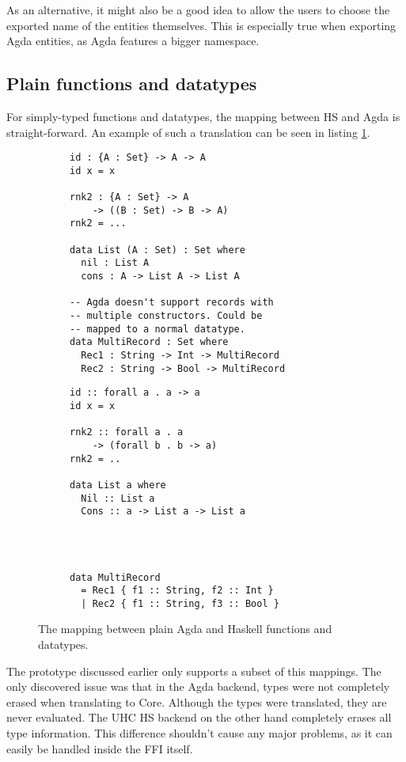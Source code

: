 \documentclass[12pt, a4paper, twoside]{report}
\begin{document}
As an alternative, it might also be a good idea to allow the users to choose the exported name of the entities themselves.
This is especially true when exporting Agda entities, as Agda features a bigger namespace.

\subsection{Plain functions and datatypes}
For simply-typed functions and datatypes, the mapping between HS and Agda is straight-forward. An example of such
a translation can be seen in listing \ref{lst:plain-agda-hs}.
\begin{figure}
\begin{subfigure}[b]{0.5\textwidth}
\begin{lstlisting}
id : {A : Set} -> A -> A
id x = x

rnk2 : {A : Set} -> A
    -> ((B : Set) -> B -> A)
rnk2 = ...

data List (A : Set) : Set where
  nil : List A
  cons : A -> List A -> List A

-- Agda doesn't support records with
-- multiple constructors. Could be
-- mapped to a normal datatype.
data MultiRecord : Set where
  Rec1 : String -> Int -> MultiRecord
  Rec2 : String -> Bool -> MultiRecord
\end{lstlisting}
\end{subfigure}
\hspace{10pt}
\begin{subfigure}[b]{0.5\textwidth}
\begin{lstlisting}
id :: forall a . a -> a
id x = x

rnk2 :: forall a . a
    -> (forall b . b -> a)
rnk2 = ..

data List a where
  Nil :: List a
  Cons :: a -> List a -> List a




data MultiRecord
  = Rec1 { f1 :: String, f2 :: Int }
  | Rec2 { f1 :: String, f3 :: Bool }
\end{lstlisting}
\end{subfigure}
\caption{The mapping between plain Agda and Haskell functions and datatypes.}
\label{lst:plain-agda-hs}
\end{figure}

The prototype discussed earlier only supports a subset of this mappings. The only discovered
issue was that in the Agda backend, types were not completely erased when translating to Core.
Although the types were translated, they are never evaluated. The UHC HS backend on the
other hand completely erases all type information. This difference shouldn't cause any major problems,
as it can easily be handled inside the FFI itself.
\end{document}
